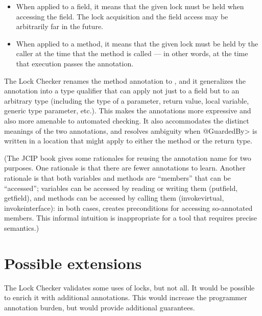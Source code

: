 \begin{itemize}
\item
  When applied to a field, it means that the given lock must be held when
  accessing the field.  The lock acquisition and the field access may be
  arbitrarily far in the future.
\item
  When applied to a method, it means that the given lock must be held by
  the caller at the time that the method is called --- in other words, at
  the time that execution passes the  annotation.
\end{itemize}

The Lock Checker renames the method annotation to
, and it generalizes the 
 annotation into a type qualifier
that can apply not just to a field but to an arbitrary type (including the
type of a parameter, return value, local variable, generic type parameter,
etc.).  This makes the annotations more expressive and also more amenable
to automated checking.  It also accommodates the distinct
meanings of the two annotations, and resolves ambiguity when \<@GuardedBy>
is written in a location that might apply to either the method or the
return type.

(The JCIP book gives some rationales for reusing the annotation name for
two purposes.  One rationale is
that there are fewer annotations to learn.  Another rationale is
that both variables and methods are ``members'' that can be ``accessed'';
variables can be accessed by reading or writing them (putfield, getfield),
and methods can be accessed by calling them (invokevirtual,
invokeinterface):  in both cases,  creates preconditions
for accessing so-annotated members.  This informal intuition is
inappropriate for a tool that requires precise semantics.)



\section{Possible extensions\label{lock-extensions}}

The Lock Checker validates some uses of locks, but not all.  It would be
possible to enrich it with additional annotations.  This would increase the
programmer annotation burden, but would provide additional guarantees.

